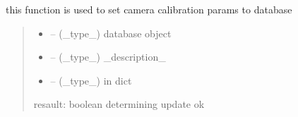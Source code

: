 \documentclass[letterpaper,10pt,english]{sphinxmanual}
\begin{document}
\begin{savenotes}\begin{fulllineitems}
\label{\detokenize{setting/backend/camera_funcs:oxin.backend.camera_funcs.set_camera_calibration_params_to_db}}
\pysigstartsignatures
{}
\pysigstopsignatures
\sphinxAtStartPar
this function is used to set camera calibration params to database
\begin{quote}\begin{description}
\begin{itemize}
\item {} 
\sphinxAtStartPar
{} – (\_type\_) database object

\item {} 
\sphinxAtStartPar
{} – (\_type\_) \_description\_

\item {} 
\sphinxAtStartPar
{} – (\_type\_) in dict

\end{itemize}

\sphinxAtStartPar
resault: boolean determining update ok

\end{description}\end{quote}

\end{fulllineitems}\end{savenotes}

\end{document}

